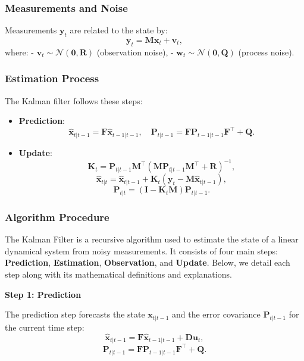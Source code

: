 \documentclass[12pt,a4paper]{article}
\begin{document}
\subsubsection{Measurements and Noise}
Measurements \( \mathbf{y}_t \) are related to the state by:
\[
\mathbf{y}_t = \mathbf{M}\mathbf{x}_t + \mathbf{v}_t,
\]
where:
- \( \mathbf{v}_t \sim \mathcal{N}(\mathbf{0}, \mathbf{R}) \) (observation noise),
- \( \mathbf{w}_t \sim \mathcal{N}(\mathbf{0}, \mathbf{Q}) \) (process noise).

\subsubsection{Estimation Process}
The Kalman filter follows these steps:
\begin{itemize}
    \item \textbf{Prediction}:
    \[
    \hat{\mathbf{x}}_{t|t-1} = \mathbf{F}\hat{\mathbf{x}}_{t-1|t-1}, \quad
    \mathbf{P}_{t|t-1} = \mathbf{F}\mathbf{P}_{t-1|t-1}\mathbf{F}^\top + \mathbf{Q}.
    \]
    \item \textbf{Update}:
    \[
    \mathbf{K}_t = \mathbf{P}_{t|t-1} \mathbf{M}^\top (\mathbf{M} \mathbf{P}_{t|t-1} \mathbf{M}^\top + \mathbf{R})^{-1},
    \]
    \[
    \hat{\mathbf{x}}_{t|t} = \hat{\mathbf{x}}_{t|t-1} + \mathbf{K}_t (\mathbf{y}_t - \mathbf{M}\hat{\mathbf{x}}_{t|t-1}),
    \]
    \[
    \mathbf{P}_{t|t} = (\mathbf{I} - \mathbf{K}_t \mathbf{M}) \mathbf{P}_{t|t-1}.
    \]
\end{itemize}
\subsubsection{Algorithm Procedure}
The Kalman Filter is a recursive algorithm used to estimate the state of a linear dynamical system from noisy measurements. It consists of four main steps: \textbf{Prediction}, \textbf{Estimation}, \textbf{Observation}, and \textbf{Update}. Below, we detail each step along with its mathematical definitions and explanations.

\textbf{Step 1: Prediction}

The prediction step forecasts the state \( \mathbf{x}_{t|t-1} \) and the error covariance \( \mathbf{P}_{t|t-1} \) for the current time step:
\[
\hat{\mathbf{x}}_{t|t-1} = \mathbf{F}\hat{\mathbf{x}}_{t-1|t-1} + \mathbf{D}\mathbf{u}_t,
\]
\[
\mathbf{P}_{t|t-1} = \mathbf{F}\mathbf{P}_{t-1|t-1}\mathbf{F}^\top + \mathbf{Q}.
\]
\end{document}
